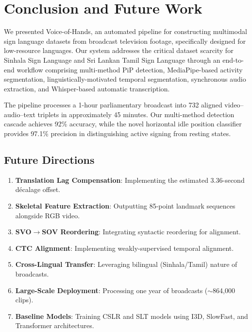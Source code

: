 \documentclass[journal]{IEEEtran}
\begin{document}
\section{Conclusion and Future Work}
\label{sec:conclusion}

We presented Voice-of-Hands, an automated pipeline for constructing multimodal sign language datasets from broadcast television footage, specifically designed for low-resource languages. Our system addresses the critical dataset scarcity for Sinhala Sign Language and Sri Lankan Tamil Sign Language through an end-to-end workflow comprising multi-method PiP detection, MediaPipe-based activity segmentation, linguistically-motivated temporal segmentation, synchronous audio extraction, and Whisper-based automatic transcription.

The pipeline processes a 1-hour parliamentary broadcast into 732 aligned video--audio--text triplets in approximately 45 minutes. Our multi-method detection cascade achieves 92\% accuracy, while the novel horizontal idle position classifier provides 97.1\% precision in distinguishing active signing from resting states.

\subsection{Future Directions}

\begin{enumerate}
    \item \textbf{Translation Lag Compensation}: Implementing the estimated 3.36-second décalage offset.
    \item \textbf{Skeletal Feature Extraction}: Outputting 85-point landmark sequences alongside RGB video.
    \item \textbf{SVO$\rightarrow$SOV Reordering}: Integrating syntactic reordering for alignment.
    \item \textbf{CTC Alignment}: Implementing weakly-supervised temporal alignment.
    \item \textbf{Cross-Lingual Transfer}: Leveraging bilingual (Sinhala/Tamil) nature of broadcasts.
    \item \textbf{Large-Scale Deployment}: Processing one year of broadcasts ($\sim$864,000 clips).
    \item \textbf{Baseline Models}: Training CSLR and SLT models using I3D, SlowFast, and Transformer architectures.
\end{enumerate}



\end{document}
